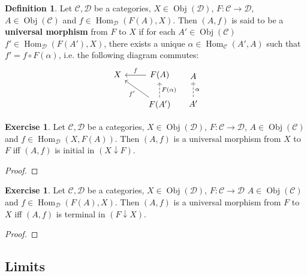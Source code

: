 \documentclass[12pt]{amsart}
\theoremstyle{definition}
\newtheorem{defn}[definition]{Definition}
\newtheorem{ex}[definition]{Exercise}
\newcommand{\al}{\alpha}
\newcommand{\MC}{\mathcal{C}}
\newcommand{\MD}{\mathcal{D}}
\DeclareMathOperator{\Obj}{Obj}
\DeclareMathOperator{\Hom}{Hom}
\DeclareMathOperator*{\0}{\mbf{0}}
\DeclareMathOperator*{\1}{\mbf{1}}
\begin{document}
	\begin{defn}
		Let $\MC, \MD$ be a categories, $X \in \Obj(\MD)$, $F: \MC \rightarrow \MD$, $A \in \Obj(\MC)$ and $f \in \Hom_{\MD}(F(A), X)$. Then $(A, f)$ is said to be a \textbf{universal morphism} from $F$ to $X$ if for each $A' \in \Obj(\MC)$ $f' \in \Hom_{\MD}(F(A'), X)$, there exists a unique $\al \in \Hom_{\MC}(A', A)$ such that $f' = f \circ F(\al)$, i.e. the following diagram commutes:
		\[
		\begin{tikzcd}
			X   & F(A) \arrow[l, "f"'] \\
			& F(A')  \arrow[ul, "f'"] \arrow[u, "F(\al)"', dashed]  
		\end{tikzcd}
		\hspace{.3cm}
		\begin{tikzcd}
			A \\
			A'  \arrow[u, "\al"', dashed]   
		\end{tikzcd}
		\]
	\end{defn}

	\begin{ex}
		Let $\MC, \MD$ be a categories, $X \in \Obj(\MD)$, $F: \MC \rightarrow \MD$, $A \in \Obj(\MC)$ and $f \in \Hom_{\MD}(X, F(A))$. Then $(A, f)$ is a universal morphism from $X$ to $F$ iff $(A, f)$ is initial in $(X \downarrow F)$.  
	\end{ex}

	\begin{proof}
		
	\end{proof}

	\begin{ex}
		Let $\MC, \MD$ be a categories, $X \in \Obj(\MD)$, $F: \MC \rightarrow \MD$ $A \in \Obj(\MC)$ and $f \in \Hom_{\MD}(F(A), X)$. Then $(A, f)$ is a universal morphism from $F$ to $X$ iff $(A, f)$ is terminal in $(F \downarrow X)$.  
	\end{ex}

	\begin{proof}
		
	\end{proof}


















	
	
	\newpage
	\subsection{Limits}
	
\end{document}
